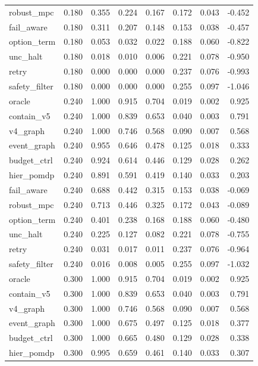 \documentclass{article}
\begin{document}
\begin{longtable}{@{}lrrrrrrr@{}}
robust\_mpc & 0.180 & 0.355 & 0.224 & 0.167 & 0.172 & 0.043 & -0.452 \\
fail\_aware & 0.180 & 0.311 & 0.207 & 0.148 & 0.153 & 0.038 & -0.457 \\
option\_term & 0.180 & 0.053 & 0.032 & 0.022 & 0.188 & 0.060 & -0.822 \\
unc\_halt & 0.180 & 0.018 & 0.010 & 0.006 & 0.221 & 0.078 & -0.950 \\
retry & 0.180 & 0.000 & 0.000 & 0.000 & 0.237 & 0.076 & -0.993 \\
safety\_filter & 0.180 & 0.000 & 0.000 & 0.000 & 0.255 & 0.097 & -1.046 \\
oracle & 0.240 & 1.000 & 0.915 & 0.704 & 0.019 & 0.002 & 0.925 \\
contain\_v5 & 0.240 & 1.000 & 0.839 & 0.653 & 0.040 & 0.003 & 0.791 \\
v4\_graph & 0.240 & 1.000 & 0.746 & 0.568 & 0.090 & 0.007 & 0.568 \\
event\_graph & 0.240 & 0.955 & 0.646 & 0.478 & 0.125 & 0.018 & 0.333 \\
budget\_ctrl & 0.240 & 0.924 & 0.614 & 0.446 & 0.129 & 0.028 & 0.262 \\
hier\_pomdp & 0.240 & 0.891 & 0.591 & 0.419 & 0.140 & 0.033 & 0.203 \\
fail\_aware & 0.240 & 0.688 & 0.442 & 0.315 & 0.153 & 0.038 & -0.069 \\
robust\_mpc & 0.240 & 0.713 & 0.446 & 0.325 & 0.172 & 0.043 & -0.089 \\
option\_term & 0.240 & 0.401 & 0.238 & 0.168 & 0.188 & 0.060 & -0.480 \\
unc\_halt & 0.240 & 0.225 & 0.127 & 0.082 & 0.221 & 0.078 & -0.755 \\
retry & 0.240 & 0.031 & 0.017 & 0.011 & 0.237 & 0.076 & -0.964 \\
safety\_filter & 0.240 & 0.016 & 0.008 & 0.005 & 0.255 & 0.097 & -1.032 \\
oracle & 0.300 & 1.000 & 0.915 & 0.704 & 0.019 & 0.002 & 0.925 \\
contain\_v5 & 0.300 & 1.000 & 0.839 & 0.653 & 0.040 & 0.003 & 0.791 \\
v4\_graph & 0.300 & 1.000 & 0.746 & 0.568 & 0.090 & 0.007 & 0.568 \\
event\_graph & 0.300 & 1.000 & 0.675 & 0.497 & 0.125 & 0.018 & 0.377 \\
budget\_ctrl & 0.300 & 1.000 & 0.665 & 0.480 & 0.129 & 0.028 & 0.338 \\
hier\_pomdp & 0.300 & 0.995 & 0.659 & 0.461 & 0.140 & 0.033 & 0.307 \\

\end{longtable}
\end{document}
